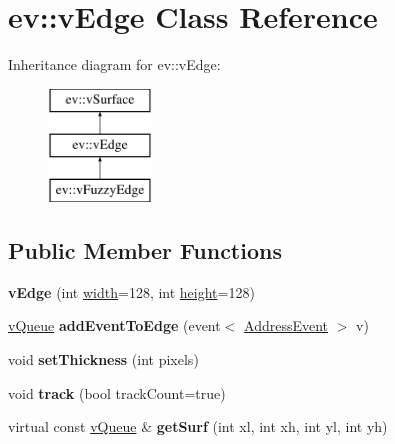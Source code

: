 \hypertarget{classev_1_1vEdge}{}\section{ev\+:\+:v\+Edge Class Reference}
\label{classev_1_1vEdge}
Inheritance diagram for ev\+:\+:v\+Edge\+:\begin{figure}[H]
\begin{center}
\leavevmode
\includegraphics[height=3.000000cm]{classev_1_1vEdge}
\end{center}
\end{figure}
\subsection*{Public Member Functions}
\begin{DoxyCompactItemize}
\item 
{\bfseries v\+Edge} (int \hyperlink{classev_1_1vSurface_a9666b7ae2580bf5647f65306f911825e}{width}=128, int \hyperlink{classev_1_1vSurface_ab3cf3df2f4fcb7eb5d89e0c5d1a5eeff}{height}=128)\hypertarget{classev_1_1vEdge_a3bbccb1784adbb0543a22e6e1a805be5}{}\label{classev_1_1vEdge_a3bbccb1784adbb0543a22e6e1a805be5}

\item 
\hyperlink{classev_1_1vQueue}{v\+Queue} {\bfseries add\+Event\+To\+Edge} (event$<$ \hyperlink{classev_1_1AddressEvent}{Address\+Event} $>$ v)\hypertarget{classev_1_1vEdge_a04bc02981fe09b9cc0615a471a4d1594}{}\label{classev_1_1vEdge_a04bc02981fe09b9cc0615a471a4d1594}

\item 
void {\bfseries set\+Thickness} (int pixels)\hypertarget{classev_1_1vEdge_a8add033e36c36c4145d932d8e210750a}{}\label{classev_1_1vEdge_a8add033e36c36c4145d932d8e210750a}

\item 
void {\bfseries track} (bool track\+Count=true)\hypertarget{classev_1_1vEdge_a7e0dd1c7f362d79a0cef3298caa74f8a}{}\label{classev_1_1vEdge_a7e0dd1c7f362d79a0cef3298caa74f8a}

\item 
virtual const \hyperlink{classev_1_1vQueue}{v\+Queue} \& {\bfseries get\+Surf} (int xl, int xh, int yl, int yh)\hypertarget{classev_1_1vEdge_a87ffb2ce22e33ff630703dfd8cb24f8e}{}\label{classev_1_1vEdge_a87ffb2ce22e33ff630703dfd8cb24f8e}

\end{DoxyCompactItemize}
